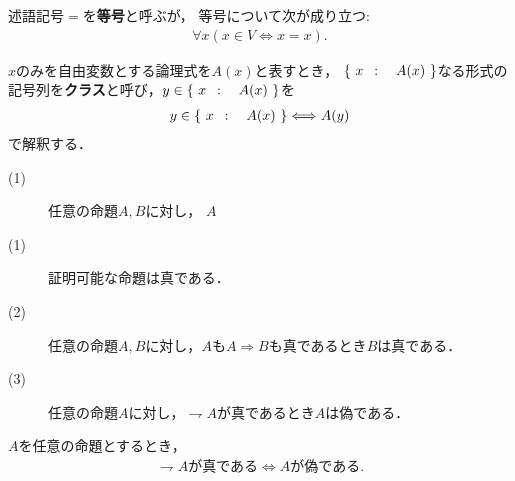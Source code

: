 	\begin{screen}
		\begin{axm}[等号の公理]
			述語記号$=$を{\bf 等号}と呼ぶが，
			等号について次が成り立つ:
			\begin{align}
				\forall x (x \in V \Longleftrightarrow x=x).
			\end{align}
		\end{axm}
	\end{screen}
	
	\begin{screen}
		\begin{dfn}[クラス]
			$x$のみを自由変数とする論理式を$A(x)$と表すとき，
			$\left\{\ x\ \, : \quad A(x)\ \right\}$なる形式の記号列を{\bf クラス}と呼び，$y \in \left\{\ x\ \, : \quad A(x)\ \right\}$を
			\begin{align}
				y \in \left\{\ x\ \, : \quad A(x)\ \right\} \Longleftrightarrow A(y)
			\end{align}
			で解釈する．
		\end{dfn}
	\end{screen}
	
	\begin{screen}
		\begin{axm}[命題論理の公理]\mbox{}
			\begin{description}
				\item[(1)] 任意の命題$A,B$に対し，
					$A $
				\item[(1)] 証明可能な命題は真である．
				\item[(2)] 任意の命題$A,B$に対し，$A$も$A \Longrightarrow B$も真であるとき$B$は真である．
				\item[(3)] 任意の命題$A$に対し，$\rightharpoondown A$が真であるとき$A$は偽である．
			\end{description}
		\end{axm}
	\end{screen}
	
	\begin{screen}
		\begin{thm}
			$A$を任意の命題とするとき，
			\begin{align}
				\mbox{$\rightharpoondown A$が真である} \Longleftrightarrow \mbox{$A$が偽である}.
			\end{align}
		\end{thm}
	\end{screen}